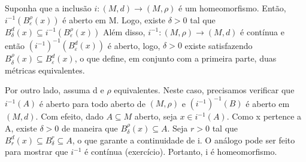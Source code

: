 \documentclass[metric_notes.tex]{subfiles}
\begin{document}
\begin{proof*}
	Suponha que a inclusão \(i:(M, d)\rightarrow (M, \rho )\) é um homeomorfismo. Então,
	\(i^{-1}(B_{\varepsilon }^{\rho }(x))\) é aberto em M. Logo, existe \(\delta > 0\) tal que
	\(B_{\delta }^{d}(x) \subseteq{i^{-1}(B_{\varepsilon }^{\rho }(x))}\)
	Além disso, \(i^{-1}:(M, \rho )\rightarrow (M, d)\) é contínua e então \((i^{-1})^{-1}(B_{\varepsilon }^{d}(x))\)
	é aberto, logo, \(\delta >0\) existe satisfazendo \(B_{\delta }^{\rho }(x) \subseteq{B_{\varepsilon }^{d}(x)}\), o
	que define, em conjunto com a primeira parte, duas métricas equivalentes.

	Por outro lado, assuma d e \(\rho \) equivalentes. Neste caso, precisamos verificar
	que \(i^{-1}(A)\) é aberto para todo aberto de \((M, \rho) \) e \((i^{-1})^{-1}(B)\) é aberto em \((M, d)\).
	Com efeito, dado \(A\subseteq{M}\) aberto, seja \(x\in i^{-1}(A)\). Como x pertence a A, existe \(\delta >0\) de
	maneira que \(B_{\delta }^{\rho }(x)\subseteq{A}.\) Seja \(r > 0\) tal que \(B_{r}^{d}(x)\subseteq{B_{\delta }^{r}}\subseteq{A}\),
	o que garante a continuidade de i. O análogo pode ser feito para mostrar que \(i^{-1}\) é contínua (exercício).
	Portanto, i é homeomorfismo. \qedsymbol
\end{proof*}
\end{document}
